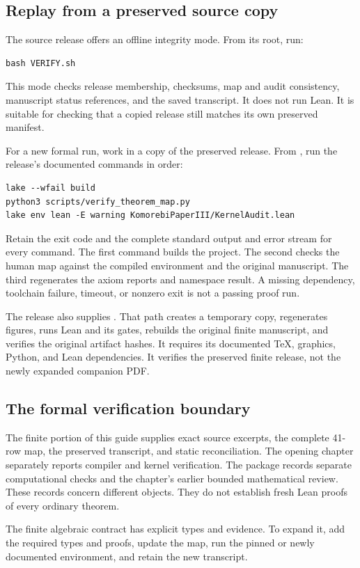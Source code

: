 \subsection{Replay from a preserved source copy}
The source release offers an offline integrity mode. From its root, run:
\begin{Verbatim}[fontsize=\small,frame=leftline,breaklines=true]
bash VERIFY.sh
\end{Verbatim}
This mode checks release membership, checksums, map and audit consistency, manuscript status references, and the saved transcript. It does not run Lean. It is suitable for checking that a copied release still matches its own preserved manifest.

For a new formal run, work in a copy of the preserved release. From , run the release's documented commands in order:
\begin{Verbatim}[fontsize=\small,frame=leftline,breaklines=true]
lake --wfail build
python3 scripts/verify_theorem_map.py
lake env lean -E warning KomorebiPaperIII/KernelAudit.lean
\end{Verbatim}
Retain the exit code and the complete standard output and error stream for every command. The first command builds the project. The second checks the human map against the compiled environment and the original manuscript. The third regenerates the axiom reports and namespace result. A missing dependency, toolchain failure, timeout, or nonzero exit is not a passing proof run.

The release also supplies . That path creates a temporary copy, regenerates figures, runs Lean and its gates, rebuilds the original finite manuscript, and verifies the original artifact hashes. It requires its documented TeX, graphics, Python, and Lean dependencies. It verifies the preserved finite release, not the newly expanded companion PDF.

\subsection{The formal verification boundary}
The finite portion of this guide supplies exact source excerpts, the complete 41-row map, the preserved transcript, and static reconciliation. The opening chapter separately reports compiler and kernel verification. The package records separate computational checks and the chapter's earlier bounded mathematical review. These records concern different objects. They do not establish fresh Lean proofs of every ordinary theorem.

The finite algebraic contract has explicit types and evidence. To expand it, add the required types and proofs, update the map, run the pinned or newly documented environment, and retain the new transcript.
